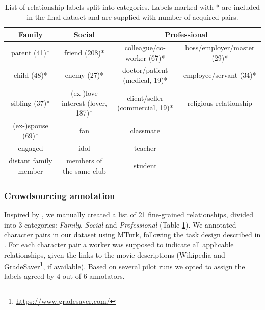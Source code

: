 \begin{table}[h!]
\centering
\begin{adjustbox}{width=0.9\textwidth}
\begin{tabular}{cccc}
\textbf{Family}       & \textbf{Social}          & \multicolumn{2}{c}{\textbf{Professional}}  \\ \toprule
parent (41)*                & friend (208)*                   & colleague/co-worker (67)*  &  boss/employer/master (29)* \\
child (48)*                 & enemy (27)*                    & doctor/patient (medical, 19)*       &  employee/servant (34)* \\
sibling (37)*               & (ex-)love interest (lover, 187)*       & client/seller (commercial, 19)*        &  religious relationship \\
(ex-)spouse (69)*           & fan                      & classmate       \\
engaged               & idol                     & teacher                \\
distant family member & members of the same club & student                \\
\end{tabular}
\end{adjustbox}
\caption{List of relationship labels split into categories. Labels marked with * are included in the final dataset and are supplied with number of acquired pairs.}
\label{relation-list}
\end{table}

\subsubsection{Crowdsourcing annotation}

Inspired by \citet{massey2015annotating}, we manually created a list of 21 fine-grained relationships, divided into 3 categories: \emph{Family}, \emph{Social} and \emph{Professional} (Table \ref{relation-list}). %
We annotated character pairs in our dataset using MTurk, following the task design described in \citet{massey2015annotating}. For each character pair a worker was supposed to indicate all applicable relationships, given the links to the movie descriptions (Wikipedia and GradeSaver\footnote{\url{https://www.gradesaver.com/}}, if available). Based on several pilot runs we opted to assign the labels agreed by 4 out of 6 annotators.

